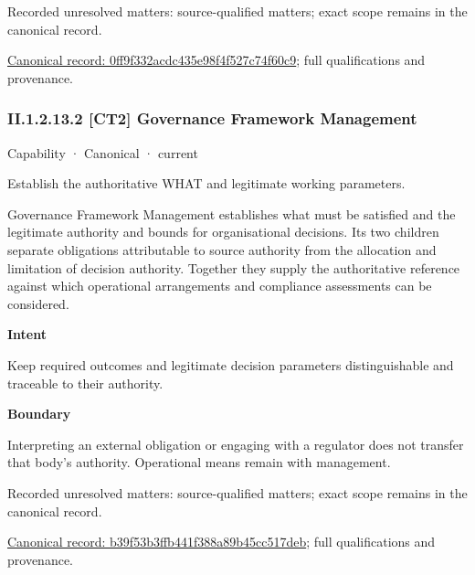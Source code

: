 {\small Recorded unresolved matters: source-qualified matters; exact scope remains in the canonical record.}\par
{\footnotesize \href{../../../../../../../continuum/strategy/capability/0ff9f332acdc435e98f4f527c74f60c9.md}{Canonical record: 0ff9f332acdc435e98f4f527c74f60c9}; full qualifications and provenance.}\par
\subsubsection*{II.1.2.13.2 [CT2] Governance Framework Management}
\label{navigation:II.1.2.13.2}

\label{element:b39f53b3ffb441f388a89b45cc517deb}
{\small Capability · Canonical · current}\par

Establish the authoritative WHAT and legitimate working parameters.



Governance Framework Management establishes what must be satisfied and the legitimate authority and bounds for organisational decisions. Its two children separate obligations attributable to source authority from the allocation and limitation of decision authority. Together they supply the authoritative reference against which operational arrangements and compliance assessments can be considered.



\textbf{Intent}



Keep required outcomes and legitimate decision parameters distinguishable and traceable to their authority.



\textbf{Boundary}



Interpreting an external obligation or engaging with a regulator does not transfer that body's authority. Operational means remain with management.


{\small Recorded unresolved matters: source-qualified matters; exact scope remains in the canonical record.}\par
{\footnotesize \href{../../../../../../../continuum/strategy/capability/b39f53b3ffb441f388a89b45cc517deb.md}{Canonical record: b39f53b3ffb441f388a89b45cc517deb}; full qualifications and provenance.}\par
